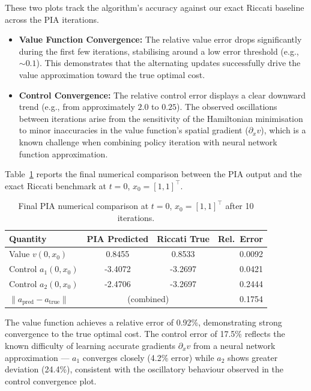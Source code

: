 \documentclass[12pt, a4paper]{article}
\begin{document}
These two plots track the algorithm's accuracy against our exact Riccati baseline across the PIA iterations.
\begin{itemize}
\item \textbf{Value Function Convergence:} The relative value error drops significantly during the first few iterations, stabilising around a low error threshold (e.g., $\sim 0.1$). This demonstrates that the alternating updates successfully drive the value approximation toward the true optimal cost.
\item \textbf{Control Convergence:} The relative control error displays a clear downward trend (e.g., from approximately $2.0$ to $0.25$). The observed oscillations between iterations arise from the sensitivity of the Hamiltonian minimisation to minor inaccuracies in the value function's spatial gradient ($\partial_x v$), which is a known challenge when combining policy iteration with neural network function approximation.
\end{itemize}
\noindent Table~\ref{tab:pia_final} reports the final numerical comparison between the PIA output and the exact Riccati benchmark at $t=0$, $x_0 = [1,1]^\top$.

\begin{table}[H]
    \centering
    \begin{tabular}{lccr}
        \toprule
        \textbf{Quantity} & \textbf{PIA Predicted} & \textbf{Riccati True} & \textbf{Rel.\ Error} \\
        \midrule
        Value $v(0, x_0)$                            & 0.8455 & 0.8533 & 0.0092 \\
        Control $a_1(0, x_0)$                        & -3.4072 & -3.2697 & 0.0421 \\
        Control $a_2(0, x_0)$                        & -2.4706 & -3.2697 & 0.2444 \\
        $\|a_{\mathrm{pred}} - a_{\mathrm{true}}\|$ & \multicolumn{2}{c}{(combined)} & 0.1754 \\
        \bottomrule
    \end{tabular}
    \caption{Final PIA numerical comparison at $t=0$, $x_0=[1,1]^\top$ after 10 iterations.}
    \label{tab:pia_final}
\end{table}
The value function achieves a relative error of 0.92\%, 
demonstrating strong convergence to the true optimal cost. 
The control error of 17.5\% reflects the known difficulty of 
learning accurate gradients $\partial_x v$ from a neural network 
approximation — $a_1$ converges closely (4.2\% error) while $a_2$ 
shows greater deviation (24.4\%), consistent with the oscillatory 
behaviour observed in the control convergence plot.
\end{document}
